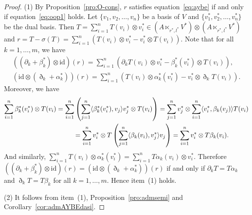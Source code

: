 \documentclass[10pt,a4paper]{amsart}
\numberwithin{equation}{section}
\newcommand{\id}{\mathrm{id}}
\begin{document}
\begin{proof}
 (1)
 By Proposition~\ref{pro:O-cons}, $r$ satisfies equation~\eqref{eq:aybe} if and only if equation~\eqref{eq:oop1} holds.
 Let $\{v_1, v_2, \dots, v_n\}$ be a basis of $V$ and $\{v_1^*, v_2^*, \dots, v_n^*\}$ be the dual basis.
 Then $T = \sum_{i=1}^n T(v_i) \otimes v_i^* \in (A \ltimes_{r^*, l^*} V^*) \otimes(A \ltimes_{r^*, l^*} V^*)$ and
 $r = T - \sigma(T) = \sum_{i=1}^n (T(v_i) \otimes v_i^* - v_i^* \otimes T(v_i))$.
 Note that for all $k=1, \dots, m$, we have
 \begin{gather*}
 ((\partial_k + \beta_k^*) \otimes \id)(r) = \sum_{i=1}^n (\partial_k T(v_i) \otimes v_i^* - \beta_k^*(v_i^*) \otimes T(v_i)),\\
 (\id \otimes(\eth_k + \alpha_k^*))(r) = \sum_{i=1}^n (T(v_i)\otimes \alpha_k^*(v_i^*) - v_i^* \otimes \eth_k T(v_i)).
 \end{gather*}
 Moreover, we have
 \begin{gather*}
 \sum_{i=1}^n \beta_k^*(v_i^*) \otimes T(v_i) = \sum_{i=1}^n\left(\sum_{j=1}^n \langle \beta_k^*(v_i^*), v_j \rangle v_j^* \otimes T(v_i)\right) = \sum_{j=1}^n v_j^* \otimes \sum_{i=1}^n
 \langle v_i^*, \beta_k(v_j) \rangle T(v_i) \\
 \hphantom{\sum_{i=1}^n \beta_k^*(v_i^*) \otimes T(v_i}{}
 =\sum_{i=1}^n v_i^* \otimes T\left(\sum_{j=1}^n \langle \beta_k(v_i), v_j^* \rangle v_j\right) = \sum_{i=1}^n v_i^* \otimes T \beta_k(v_i).
 \end{gather*}
 And similarly, $\sum_{i=1}^n T(v_i) \otimes \alpha_k^*(v_i^*) = \sum_{i=1}^n T \alpha_k(v_i)\otimes v_i^*$.
 Therefore $((\partial_k + \beta_k^*)\otimes \id)(r) = (\id \otimes (\eth_k + \alpha_k^*))(r)$ if and only if
 $\partial_k T = T \alpha_k$ and $\eth_k T = T \beta_k$ for all $k=1, \dots, m$.
 Hence item~(1) holds.

(2) It follows from item~(1), Proposition~\ref{pro:admsemi} and Corollary~\ref{cor:admAYBEdasi}.
\end{proof}
\end{document}

